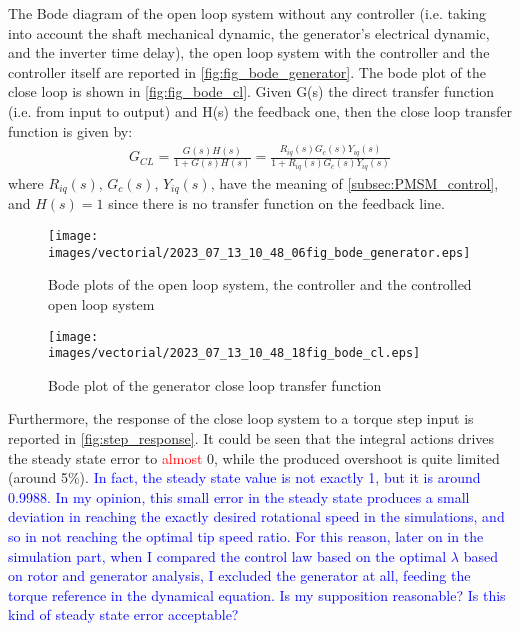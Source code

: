  The Bode diagram of the open loop system without any controller (i.e. taking into account the shaft mechanical dynamic, the generator's electrical dynamic, and the inverter time delay), the open loop system with the controller and the controller itself are reported in \autoref{fig:fig_bode_generator}. The bode plot of the close loop is shown in \autoref{fig:fig_bode_cl}. Given G(s) the direct transfer function (i.e. from input to output) and H(s) the feedback one, then the close loop transfer function is given by:
 \begin{gather}
     G_{CL}=\frac{G(s)H(s)}{1+G(s)H(s)}=\frac{R_{iq}(s)G_c(s)Y_{iq}(s)}{1+R_{iq}(s)G_c(s)Y_{iq}(s)}
     \label{eq:close_loop_TF}
 \end{gather}
 where $R_{iq}(s)$, $G_c(s)$, $Y_{iq}(s)$, have the meaning of \autoref{subsec:PMSM_control}, and $H(s)=1$ since there is no transfer function on the feedback line.
 
\begin{figure}[htb]
    \centering
    \texttt{[image: images/vectorial/2023\_07\_13\_10\_48\_06fig\_bode\_generator.eps]}
    \caption{Bode plots of the open loop system, the controller and the controlled open loop system}
    \label{fig:fig_bode_generator}
 \end{figure}

 \begin{figure}[htb]
    \centering
    \texttt{[image: images/vectorial/2023\_07\_13\_10\_48\_18fig\_bode\_cl.eps]}
    \caption{Bode plot of the generator close loop transfer function}
    \label{fig:fig_bode_cl}
 \end{figure}

Furthermore, the response of the close loop system to a torque step input is reported in \autoref{fig:step_response}. It could be seen that the integral actions drives the steady state error to \textcolor{red}{almost} 0, while the produced overshoot is quite limited (around 5\%). \textcolor{blue}{In fact, the steady state value is not exactly 1, but it is around 0.9988. In my opinion, this small error in the steady state produces a small deviation in reaching the exactly desired rotational speed in the simulations, and so in not reaching the optimal tip speed ratio. For this reason, later on in the simulation part, when I compared the control law based on the optimal $\lambda$ based on rotor and generator analysis, I excluded the generator at all, feeding the torque reference in the dynamical equation. Is my supposition reasonable? Is this kind of steady state error acceptable?}

